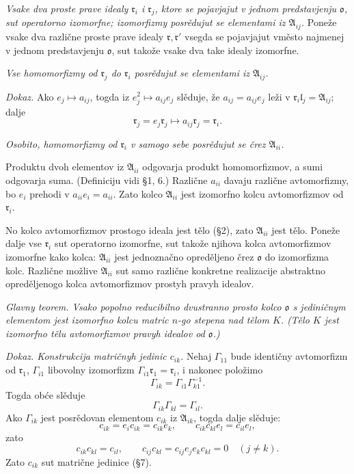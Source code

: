 \documentclass[11pt]{article}
\providecommand{\mA}{\mathfrak{A}}
\providecommand{\ml}{\mathfrak{l}}
\providecommand{\mo}{\mathfrak{o}}
\providecommand{\mr}{\mathfrak{r}}
\begin{document}
\emph{Vsake dva proste prave idealy $\mr_i$ i $\mr_j$, ktore se pojavjajut v jednom predstavjenju $\mo$, sut operatorno izomorfne; izomorfizmy posrědujut se elementami iz $\mA_{ij}$.} Poneže vsake dva različne proste prave idealy $\mr,\mr'$ vsegda se pojavjajut vměsto najmenej v jednom predstavjenju $\mo$, sut takože vsake dva take idealy izomorfne.

\emph{Vse homomorfizmy od $\mr_j$ do $\mr_i$ posrědujut se elementami iz $\mA_{ij}$.}

\emph{Dokaz.} Ako $e_j\mapsto a_{ij}$, togda iz $e_j^2\mapsto a_{ij}e_j$ slěduje, že $a_{ij}=a_{ij}e_j$ leži v $\mr_i\ml_j=\mA_{ij}$; dalje
\[
        \mr_j=e_j\mr_j\mapsto a_{ij}\mr_j=\mr_i.
\]

\emph{Osobito, homomorfizmy od $\mr_i$ v samogo sebe posrědujut se črez $\mA_{ii}$.}

Produktu dvoh elementov iz $\mA_{ii}$ odgovarja produkt homomorfizmov, a sumi odgovarja suma. (Definiciju vidi §1, 6.) Različne $a_{ii}$ davaju različne avtomorfizmy, bo $e_i$ prehodi v $a_{ii}e_i=a_{ii}$. Zato kolco $\mA_{ii}$ jest izomorfno kolcu avtomorfizmov od $\mr_i$.

No kolco avtomorfizmov prostogo ideala jest tělo (§2), zato $\mA_{ii}$ jest tělo. Poneže dalje vse $\mr_i$ sut operatorno izomorfne, sut takože njihova kolca avtomorfizmov izomorfne kako kolca: $\mA_{ii}$ jest jednoznačno opreděljeno črez $\mo$ do izomorfizma kolc. Različne možlive $\mA_{ii}$ sut samo različne konkretne realizacije abstraktno opreděljenogo kolca avtomorfizmov prostyh pravyh idealov.

\emph{Glavny teorem. Vsako popolno reducibilno dvustranno prosto kolco $\mo$ s jediničnym elementom jest izomorfno kolcu matric $n$-go stepena nad tělom $K$. (Tělo $K$ jest izomorfno tělu avtomorfizmov pravyh idealov od $\mo$.)}

\emph{Dokaz. Konstrukcija matričnyh jedinic $c_{ik}$.} Nehaj $\Gamma_{11}$ bude identičny avtomorfizm od $\mr_1$, $\Gamma_{i1}$ libovolny izomorfizm $\Gamma_{i1}\mr_1=\mr_i$, i nakonec položimo
\[
        \Gamma_{ik}=\Gamma_{i1}\Gamma_{k1}^{-1}.
\]
Togda obće slěduje
\[
        \Gamma_{ik}\Gamma_{kl}=\Gamma_{il}.
\]
Ako $\Gamma_{ik}$ jest posrědovan elementom $c_{ik}$ iz $\mA_{ik}$, togda dalje slěduje:
\[
        c_{ik}=e_i c_{ik}=c_{ik}e_k,
        \qquad
        c_{ik}c_{kl}e_l=c_{il}e_l,
\]
zato
\[
        c_{ik}c_{kl}=c_{il},
        \qquad
        c_{ij}c_{kl}=c_{ij}e_j e_k c_{kl}=0\quad(j\ne k).
\]
Zato $c_{ik}$ sut matrične jedinice (§7).
\end{document}
